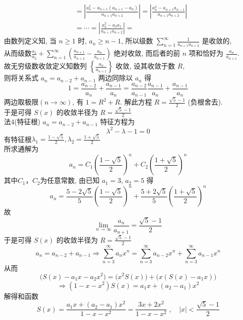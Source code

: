 \documentclass[color=green,titlestyle=hang]{elegantbook}%
\begin{document}
\begin{solution}
\begin{align*}
&=\left|\frac{a_{n}^2-a_{n+1}(a_{n+1}-a_{n})}{a_{n+1}a_{n+2}}\right|
=\left|\frac{a_{n}^2-a_{n+1}a_{n-1}}{a_{n+1}a_{n+2}}\right|\\
&=\cdots=\left|\frac{a_{2}^2-a_{3}a_{1}}{a_{n+1}a_{n+2}}\right|=
\end{align*}
由数列定义知, 当 $n\geqslant1$ 时, $a_n\geqslant n-1$, 所以级数 $\sum_{n=1}^{\infty}\frac{1}{a_{n+1}a_{n+2}}$ 是收敛的, \\
从而级数$\frac{a_1}{a_2}+\sum_{n=1}^{\infty}\left(\frac{a_{n+1}}{a_{n+2}}-\frac{a_{n}}{a_{n+1}}\right)$ 绝对收敛, 而后者的前 $n$ 项和恰好为 $\frac{a_{n}}{a_{n+1}}$. \\
故无穷级数收敛定义知数列  $\left\{\frac{a_{n}}{a_{n+1}}\right\}$ 收敛, 设其收敛于数 $R$, \\
则将关系式 $a_n=a_{n-2}+a_{n-1}$ 两边同除以 $a_n$ 得
\[1=\frac{a_{n-2}}{a_n}+\frac{a_{n-1}}{a_n}=\frac{a_{n-2}}{a_{n-1}}\frac{a_{n-1}}{a_{n}}+\frac{a_{n-1}}{a_n}\]
两边取极限$(n\to\infty)$, 有 $1=R^2+R$. 解此方程 $R=\frac{\sqrt{5}-1}{2}$ (负根舍去).\\
于是可得 $S(x)$ 的收敛半径为 $R=\frac{\sqrt{5}-1}{2}$\\
法4(特征根) $a_n=a_{n-2}+a_{n-1}$ 特征方程为 \begin{equation*}\lambda^2-\lambda-1=0\end{equation*}
有特征根$\lambda_1=\frac{1-\sqrt{5}}{2},\lambda_2=\frac{1+\sqrt{5}}{2}$\\
所求通解为
\[a_n=C_1\left(\frac{1-\sqrt{5}}{2}\right)^n+C_2\left(\frac{1+\sqrt{5}}{2}\right)^n\]
其中$C_1$，$C_2$为任意常数, 由已知 $a_1=3$, $a_2=5$ 得 
\[a_n=\frac{5-2\sqrt{5}}{5}\left(\frac{1-\sqrt{5}}{2}\right)^n+\frac{5+2\sqrt{5}}{5}\left(\frac{1+\sqrt{5}}{2}\right)^n\]
故\[\lim_{n\to\infty}\frac{a_{n}}{a_{n+1}}=\frac{\sqrt{5}-1}{2}\]
于是可得 $S(x)$ 的收敛半径为 $R=\frac{\sqrt{5}-1}{2}$
\[a_n=a_{n-2}+a_{n-1}\Longrightarrow \sum_{n=3}^{\infty}a_nx^{n}=\sum_{n=3}^{\infty}a_{n-2}x^{n}+\sum_{n=3}^{\infty}a_{n-1}x^{n}\]
从而\[\big(S(x)-a_1x-a_2x^2\big)=\big(x^2S(x)\big)+\big(x(S(x)-a_1x)\big)\]
\[\Longrightarrow(1-x-x^2)S(x)=a_1x+(a_2-a_1)x^2\]
解得和函数
\[S(x)=\frac{a_1x+(a_2-a_1)x^2}{1-x-x^2}=\frac{3x+2x^2}{1-x-x^2}\;,\quad |x|<\frac{\sqrt{5}-1}{2}\]
\end{solution}
\end{document}

